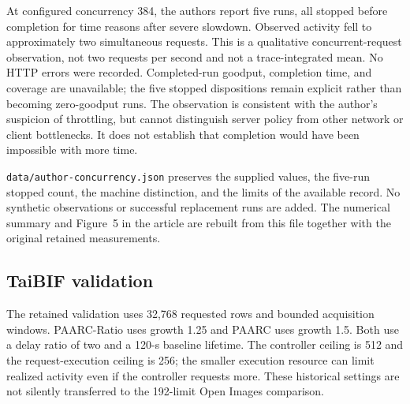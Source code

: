 \documentclass[10pt]{article}
\newcommand{\paarc}{PAARC}
\newcommand{\ratio}{PAARC-Ratio}
\begin{document}
At configured concurrency 384, the authors report five runs, all stopped before completion for time reasons after severe slowdown. Observed activity fell to approximately two simultaneous requests. This is a qualitative concurrent-request observation, not two requests per second and not a trace-integrated mean. No HTTP errors were recorded. Completed-run goodput, completion time, and coverage are unavailable; the five stopped dispositions remain explicit rather than becoming zero-goodput runs. The observation is consistent with the author's suspicion of throttling, but cannot distinguish server policy from other network or client bottlenecks. It does not establish that completion would have been impossible with more time.

\texttt{data/author-concurrency.json} preserves the supplied values, the five-run stopped count, the machine distinction, and the limits of the available record. No synthetic observations or successful replacement runs are added. The numerical summary and Figure~5 in the article are rebuilt from this file together with the original retained measurements.

\subsection{TaiBIF validation}
The retained validation uses 32,768 requested rows and bounded acquisition windows. \ratio{} uses growth 1.25 and \paarc{} uses growth 1.5. Both use a delay ratio of two and a 120-s baseline lifetime. The controller ceiling is 512 and the request-execution ceiling is 256; the smaller execution resource can limit realized activity even if the controller requests more. These historical settings are not silently transferred to the 192-limit Open Images comparison.
\end{document}

